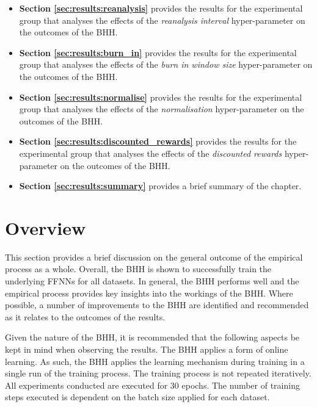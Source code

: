 \begin{itemize}
      \item \textbf{Section \ref{sec:results:reanalysis}} provides the results for the experimental group that analyses the effects of the \textit{reanalysis interval} hyper-parameter on the outcomes of the \acs{BHH}.

      \item \textbf{Section \ref{sec:results:burn_in}} provides the results for the experimental group that analyses the effects of the \textit{burn in window size} hyper-parameter on the outcomes of the \acs{BHH}.

      \item \textbf{Section \ref{sec:results:normalise}} provides the results for the experimental group that analyses the effects of the \textit{normalisation} hyper-parameter on the outcomes of the \acs{BHH}.

      \item \textbf{Section \ref{sec:results:discounted_rewards}} provides the results for the experimental group that analyses the effects of the \textit{discounted rewards} hyper-parameter on the outcomes of the \acs{BHH}.

      \item \textbf{Section \ref{sec:results:summary}} provides a brief summary of the chapter.
\end{itemize}

\section{Overview}\label{sec:results:overview}

This section provides a brief discussion on the general outcome of the empirical process as a whole. Overall, the \acs{BHH} is shown to successfully train the underlying \acp{FFNN} for all datasets. In general, the \acs{BHH} performs well and the empirical process provides key insights into the workings of the \acs{BHH}. Where possible, a number of improvements to the \acs{BHH} are identified and recommended as it relates to the outcomes of the results.

Given the nature of the \acs{BHH}, it is recommended that the following aspects be kept in mind when observing the results. The \acs{BHH} applies a form of online learning. As such, the \acs{BHH} applies the learning mechanism during training in a single run of the training process. The training process is not repeated iteratively. All experiments conducted are executed for 30 epochs. The number of training steps executed is dependent on the batch size applied for each dataset.

